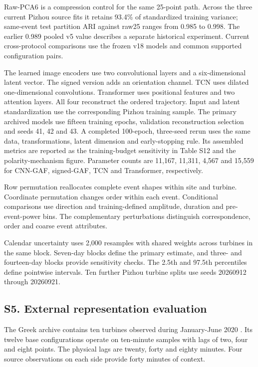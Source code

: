 \documentclass[a4paper,11pt]{article}
\begin{document}
Raw-PCA6 is a compression control for the same 25-point path. Across the three current Pizhou source fits it retains 93.4\% of standardized training variance; same-event test partition ARI against raw25 ranges from 0.985 to 0.998. The earlier 0.989 pooled v5 value describes a separate historical experiment. Current cross-protocol comparisons use the frozen v18 models and common supported configuration pairs.

The learned image encoders use two convolutional layers and a six-dimensional latent vector. The signed version adds an orientation channel. TCN uses dilated one-dimensional convolutions. Transformer uses positional features and two attention layers. All four reconstruct the ordered trajectory. Input and latent standardization use the corresponding Pizhou training sample. The primary archived models use fifteen training epochs, validation reconstruction selection and seeds 41, 42 and 43. A completed 100-epoch, three-seed rerun uses the same data, transformations, latent dimension and early-stopping rule. Its assembled metrics are reported as the training-budget sensitivity in Table S12 and the polarity-mechanism figure. Parameter counts are 11,167, 11,311, 4,567 and 15,559 for CNN-GAF, signed-GAF, TCN and Transformer, respectively.

Row permutation reallocates complete event shapes within site and turbine. Coordinate permutation changes order within each event. Conditional comparisons use direction and training-defined amplitude, duration and pre-event-power bins. The complementary perturbations distinguish correspondence, order and coarse event attributes.

Calendar uncertainty uses 2,000 resamples with shared weights across turbines in the same block. Seven-day blocks define the primary estimate, and three- and fourteen-day blocks provide sensitivity checks. The 2.5th and 97.5th percentiles define pointwise intervals. Ten further Pizhou turbine splits use seeds 20260912 through 20260921.

\subsection{S5. External representation evaluation}\label{s5.-external-representation-evaluation}

The Greek archive contains ten turbines observed during January-June 2020 \citep{greece2024}. Its twelve base configurations operate on ten-minute samples with lags of two, four and eight points. The physical lags are twenty, forty and eighty minutes. Four source observations on each side provide forty minutes of context.
\end{document}
